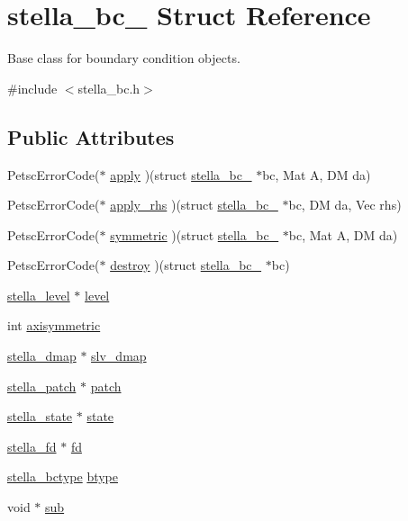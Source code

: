 \hypertarget{structstella__bc__}{}\section{stella\+\_\+bc\+\_\+ Struct Reference}
\label{structstella__bc__}


Base class for boundary condition objects.  




{\ttfamily \#include $<$stella\+\_\+bc.\+h$>$}

\subsection*{Public Attributes}
\begin{DoxyCompactItemize}
\item 
Petsc\+Error\+Code($\ast$ \mbox{\hyperlink{structstella__bc___a5b1d149d37c0630504c36a4dc3ae5e9d}{apply}} )(struct \mbox{\hyperlink{structstella__bc__}{stella\+\_\+bc\+\_\+}} $\ast$bc, Mat A, DM da)
\item 
Petsc\+Error\+Code($\ast$ \mbox{\hyperlink{structstella__bc___ab7ce4435d89288faf2913fa55cd44fb7}{apply\+\_\+rhs}} )(struct \mbox{\hyperlink{structstella__bc__}{stella\+\_\+bc\+\_\+}} $\ast$bc, DM da, Vec rhs)
\item 
Petsc\+Error\+Code($\ast$ \mbox{\hyperlink{structstella__bc___a52d038c098ef52238c994fb1a04062ee}{symmetric}} )(struct \mbox{\hyperlink{structstella__bc__}{stella\+\_\+bc\+\_\+}} $\ast$bc, Mat A, DM da)
\item 
Petsc\+Error\+Code($\ast$ \mbox{\hyperlink{structstella__bc___a4557b392d86abf64d786ed0b7f98c064}{destroy}} )(struct \mbox{\hyperlink{structstella__bc__}{stella\+\_\+bc\+\_\+}} $\ast$bc)
\item 
\mbox{\hyperlink{structstella__level}{stella\+\_\+level}} $\ast$ \mbox{\hyperlink{structstella__bc___aedec7c12ca10923dce08b29326b46196}{level}}
\item 
int \mbox{\hyperlink{structstella__bc___a16871bbe5781bbb75da7803993796ea2}{axisymmetric}}
\item 
\mbox{\hyperlink{structstella__dmap}{stella\+\_\+dmap}} $\ast$ \mbox{\hyperlink{structstella__bc___a453c6b9c2481ed13c7af4a0d335d8d85}{slv\+\_\+dmap}}
\item 
\mbox{\hyperlink{structstella__patch}{stella\+\_\+patch}} $\ast$ \mbox{\hyperlink{structstella__bc___a1c120954411b9713b927063f41277a80}{patch}}
\item 
\mbox{\hyperlink{structstella__state}{stella\+\_\+state}} $\ast$ \mbox{\hyperlink{structstella__bc___a7953ce53a948c0f3efc9434428841bf4}{state}}
\item 
\mbox{\hyperlink{structstella__fd}{stella\+\_\+fd}} $\ast$ \mbox{\hyperlink{structstella__bc___a5278ffab5eefeb6a31f20b8a9d5c5459}{fd}}
\item 
\mbox{\hyperlink{stella__bc_8h_a7959afa0ee9aae02dd31cfce273269ce}{stella\+\_\+bctype}} \mbox{\hyperlink{structstella__bc___abddb095336957605b8d2a5babaaaaf64}{btype}}
\item 
void $\ast$ \mbox{\hyperlink{structstella__bc___a8b1e44390d286055ef05ab8ec3dd48da}{sub}}
\end{DoxyCompactItemize}


